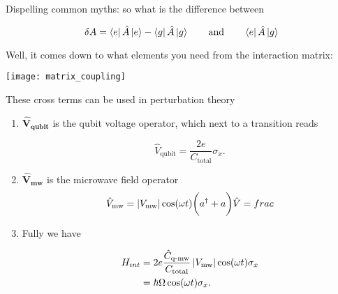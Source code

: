 \begin{framed}
  \noindent  Dispelling  common  myths:   so  what  is  the
  difference between

  \begin{equation}
    \label{eq:myth1}
    \delta A = \Bra{e}\hat{A}\Ket{e} - \Bra{g}\hat{A}\Ket{g} \qquad \text{and} \qquad \Bra{e}\hat{A}\Ket{g}
  \end{equation}

  \noindent Well, it  comes down to what  elements you need
  from the interaction matrix:

  \begin{center}
    \texttt{[image: matrix\_coupling]}

    {\small These  cross terms can be  used in perturbation
      theory\label{fig:matrix_coupling}}
  \end{center}
 
\end{framed}
\begin{enumerate}

\item  $  \mathbf{\hat{V}_\text{qubit}}   $  is  the  qubit
  voltage operator, which next to a transition reads
	
	\begin{equation}\label{eq:couple5}
          \hat{V}_\text{qubit} = \frac{2e}{C_\text{total}}\sigma_x.
	\end{equation}
	
      \item $ \mathbf{\hat{V}_\text{mw}} $ is the microwave
        field operator
	\begin{equation}\label{eq:couple6}
          {\hat{V}_\text{mw} = \ensuremath{\left|V_{\text{mw}}\right|}\cos(\omega t)\bigg(a^\dagger +a\bigg) }
          \hat{V}=frac
	\end{equation}
      \item Fully we have
	
	\begin{equation}
          \begin{aligned}
            H_{int}&=2e\frac{\hat{C}_\text{q-mw}}{C_\text{total}}\left|V_{\text{mw}}\right|\cos(\omega t)\sigma_x\\
            &= \hbar\Omega\cos(\omega t)\sigma_x.
          \end{aligned}
	\end{equation}
      \end{enumerate}

    
